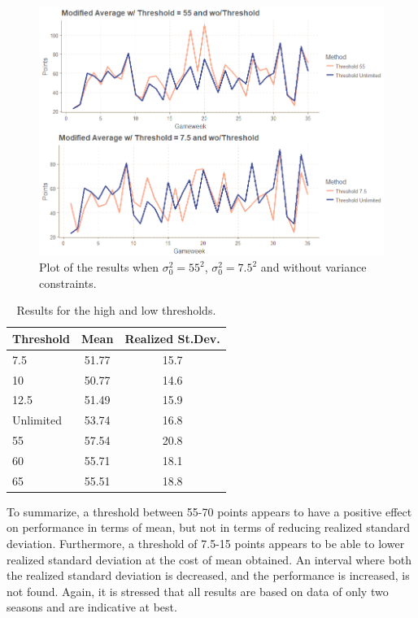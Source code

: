\begin{figure}[H]
    \centering
    \includegraphics[scale=0.5]{fig/chapter_7/var_threshold.png}
    \caption{Plot of the results when $\sigma_0^{2} = 55^2$, $\sigma_0^{2} = 7.5^2$ and without variance constraints.}
\label{fig:performance_different_threshold}    
\end{figure}%
\newpar



\begin{table}[H]
\centering
\begin{tabular}{@{}lcc@{}}
\toprule
Threshold & Mean & Realized St.Dev. \\ \midrule
7.5       & 51.77 & 15.7   \\
10        & 50.77 & 14.6   \\        %
12.5      & 51.49 & 15.9   \\
Unlimited & 53.74 & 16.8   \\
55        & 57.54 & 20.8   \\
60        & 55.71 & 18.1   \\
65        & 55.51 & 18.8   \\ \bottomrule 
\end{tabular}
\caption{Results for the high and low thresholds.}
\label{tab_high_low_thresholds}
\end{table}

\newpar

To summarize, a threshold between 55-70 points appears to have a positive effect on performance in terms of mean, but not in terms of reducing realized standard deviation. Furthermore, a threshold of 7.5-15 points appears to be able to lower realized standard deviation at the cost of mean obtained. An interval where both the realized standard deviation is decreased, and the performance is increased, is not found. Again, it is stressed that all results are based on data of only two seasons and are indicative at best.







